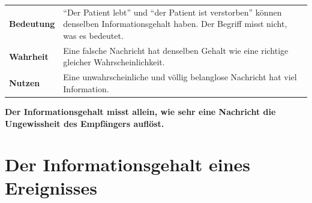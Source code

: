 \begin{warnung}
\begin{center}
{\small
\renewcommand{\arraystretch}{1.52}
\begin{tabular}{@{}P{2.4cm}P{6.2cm}@{}}
\toprule
\textbf{Bedeutung} & \enquote{Der Patient lebt} und \enquote{der Patient ist verstorben} können denselben Informationsgehalt haben. Der Begriff misst nicht, was es bedeutet.\\
\textbf{Wahrheit} & Eine falsche Nachricht hat denselben Gehalt wie eine richtige gleicher Wahrscheinlichkeit.\\
\textbf{Nutzen} & Eine unwahrscheinliche und völlig belanglose Nachricht hat viel Information.\\
\bottomrule
\end{tabular}}
\end{center}

\begin{center}
\begin{minipage}{0.9\textwidth}
\textbf{Der Informationsgehalt misst allein, wie sehr eine Nachricht die Ungewissheit des Empfängers auflöst.}
\end{minipage}
\end{center}

\begin{center}
\begin{minipage}{0.88\textwidth}
\end{minipage}
\end{center}
\end{warnung}

\section{Der Informationsgehalt eines Ereignisses}

